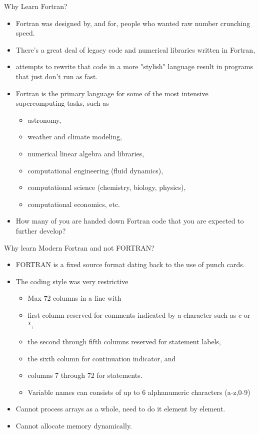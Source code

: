 \documentclass[10pt,t]{beamer}
\begin{document}
\begin{frame}{Why Learn Fortran?}
  \begin{itemize}
    \item Fortran was designed by, and for, people who wanted raw number crunching speed. 
    \item There's a great deal of legacy code and numerical libraries written in Fortran,
    \item attempts to rewrite that code in a more "stylish" language result in programs that just don't run as fast.
    \item Fortran is the primary language for some of the most intensive supercomputing tasks, such as 
    \begin{itemize}
      \item astronomy, 
      \item weather and climate modeling, 
      \item numerical linear algebra and libraries, 
      \item computational engineering (fluid dynamics), 
      \item computational science (chemistry, biology, physics), 
      \item computational economics, etc.
    \end{itemize}
    \item How many of you are handed down Fortran code that you are expected to further develop?
  \end{itemize}
\end{frame}

\begin{frame}{Why learn Modern Fortran and not FORTRAN?}
  \begin{itemize}
    \item FORTRAN is a fixed source format dating back to the use of punch cards.
    \item The coding style was very restrictive
    \begin{itemize}
      \item Max 72 columns in a line with
      \item first column reserved for comments indicated by a character such as c or *,
      \item the second through fifth columns reserved for statement labels,
      \item the sixth column for continuation indicator, and
      \item columns 7 through 72 for statements.
      \item Variable names can consists of up to 6 alphanumeric characters (a-z,0-9)
    \end{itemize}
    \item Cannot process arrays as a whole, need to do it element by element.
    \item Cannot allocate memory dynamically.
  \end{itemize}
\end{frame}
\end{document}
